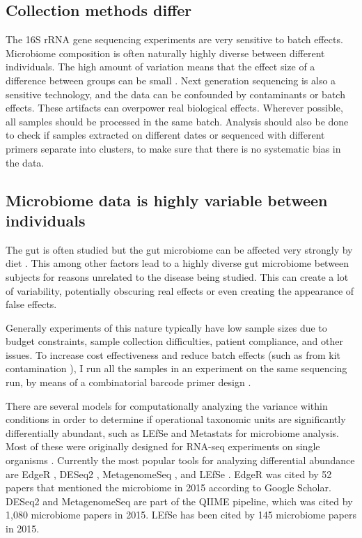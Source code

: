 \subsection{Collection methods differ}
The 16S rRNA gene sequencing experiments are very sensitive to batch effects. Microbiome composition is often naturally highly diverse between different individuals. The high amount of variation means that the effect size of a difference between groups can be small \cite{fernandes2014unifying}. Next generation sequencing is also a sensitive technology, and the data can be confounded by contaminants \cite{salter2014reagent} or batch effects. These artifacts can overpower real biological effects. Wherever possible, all samples should be processed in the same batch. Analysis should also be done to check if samples extracted on different dates or sequenced with different primers separate into clusters, to make sure that there is no systematic bias in the data.

\subsection{Microbiome data is highly variable between individuals}
The gut is often studied but the gut microbiome can be affected very strongly by diet \cite{turnbaugh2009effect}. This among other factors lead to a highly diverse gut microbiome between subjects for reasons unrelated to the disease being studied. This can create a lot of variability, potentially obscuring real effects or even creating the appearance of false effects.

Generally experiments of this nature typically have low sample sizes due to budget constraints, sample collection difficulties, patient compliance, and other issues. To increase cost effectiveness and reduce batch effects (such as from kit contamination \cite{salter2014reagent}), I run all the samples in an experiment on the same sequencing run, by means of a combinatorial barcode primer design \cite{gloor2010microbiome}.

There are several models for computationally analyzing the variance within conditions in order to determine if operational taxonomic units are significantly differentially abundant, such as LEfSe \cite{segata2011metagenomic} and Metastats \cite{paulson2011metastats} for microbiome analysis. Most of these were originally designed for RNA-seq experiments on single organisms \cite{pachter2011models}. Currently the most popular tools for analyzing differential abundance are EdgeR \cite{robinson2010edger}, DESeq2 \cite{love2014moderated}, MetagenomeSeq \cite{paulson2014metagenomeseq}, and LEfSe \cite{segata2011metagenomic}. EdgeR was cited by 52 papers that mentioned the microbiome in 2015 according to Google Scholar. DESeq2 and MetagenomeSeq are part of the QIIME pipeline, which was cited by 1,080 microbiome papers in 2015. LEfSe has been cited by 145 microbiome papers in 2015.

